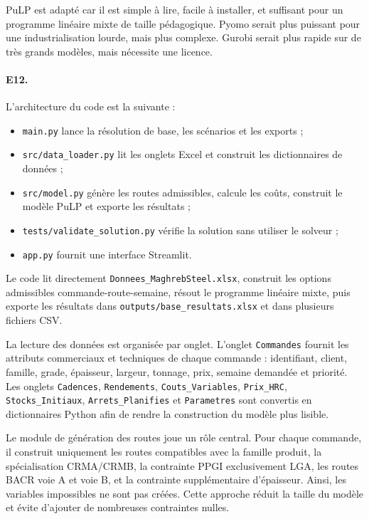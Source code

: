 \documentclass[12pt,a4paper]{article}
\newcommand{\question}[1]{\paragraph{\textcolor{blue!50!black}{#1.}}}
\begin{document}
PuLP est adapté car il est simple à lire, facile à installer, et suffisant pour un programme linéaire mixte de taille pédagogique. Pyomo serait plus puissant pour une industrialisation lourde, mais plus complexe. Gurobi serait plus rapide sur de très grands modèles, mais nécessite une licence.

\question{E12}
L'architecture du code est la suivante :

\begin{itemize}
    \item \texttt{main.py} lance la résolution de base, les scénarios et les exports ;
    \item \texttt{src/data\_loader.py} lit les onglets Excel et construit les dictionnaires de données ;
    \item \texttt{src/model.py} génère les routes admissibles, calcule les coûts, construit le modèle PuLP et exporte les résultats ;
    \item \texttt{tests/validate\_solution.py} vérifie la solution sans utiliser le solveur ;
    \item \texttt{app.py} fournit une interface Streamlit.
\end{itemize}

Le code lit directement \texttt{Donnees\_MaghrebSteel.xlsx}, construit les options admissibles commande-route-semaine, résout le programme linéaire mixte, puis exporte les résultats dans \texttt{outputs/base\_resultats.xlsx} et dans plusieurs fichiers CSV.

La lecture des données est organisée par onglet. L'onglet \texttt{Commandes} fournit les attributs commerciaux et techniques de chaque commande : identifiant, client, famille, grade, épaisseur, largeur, tonnage, prix, semaine demandée et priorité. Les onglets \texttt{Cadences}, \texttt{Rendements}, \texttt{Couts\_Variables}, \texttt{Prix\_HRC}, \texttt{Stocks\_Initiaux}, \texttt{Arrets\_Planifies} et \texttt{Parametres} sont convertis en dictionnaires Python afin de rendre la construction du modèle plus lisible.

Le module de génération des routes joue un rôle central. Pour chaque commande, il construit uniquement les routes compatibles avec la famille produit, la spécialisation CRMA/CRMB, la contrainte PPGI exclusivement LGA, les routes BACR voie A et voie B, et la contrainte supplémentaire d'épaisseur. Ainsi, les variables impossibles ne sont pas créées. Cette approche réduit la taille du modèle et évite d'ajouter de nombreuses contraintes nulles.
\end{document}
